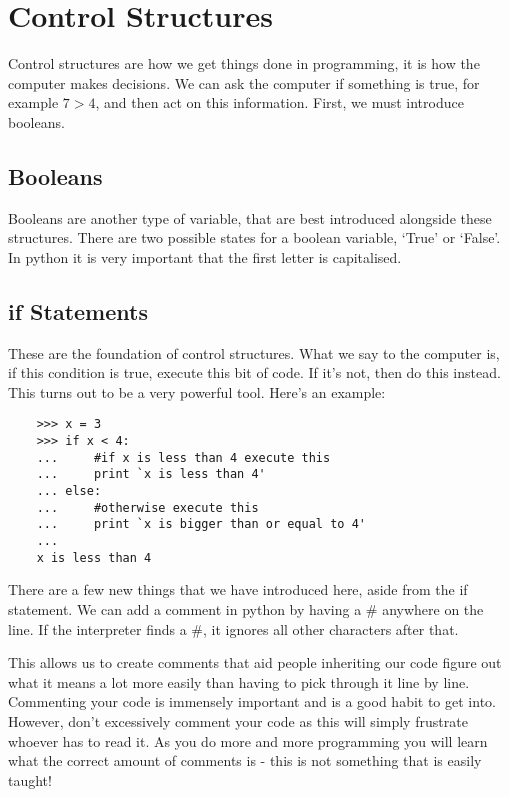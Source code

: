 \section{Control Structures}

Control structures are how we get things done in programming, it is how the
computer makes decisions. We can ask the computer if something is true, for
example $7 > 4$, and then act on this information. First, we must introduce
booleans.

\subsection {Booleans}

Booleans are another type of variable, that are best introduced alongside these
structures. There are two possible states for a boolean variable, `True' or
`False'. In python it is very important that the first letter is capitalised.

\subsection{if Statements}

These are the foundation of control structures. What we say to the computer is,
if this condition is true, execute this bit of code. If it's not, then do this
instead. This turns out to be a very powerful tool. Here's an example:

\begin{lstlisting}
    >>> x = 3
    >>> if x < 4:
    ...     #if x is less than 4 execute this
    ...     print `x is less than 4'
    ... else:
    ...     #otherwise execute this
    ...     print `x is bigger than or equal to 4'
    ...
    x is less than 4
\end{lstlisting}

There are a few new things that we have introduced here, aside from the if
statement. We can add a comment in python by having a \# anywhere on the line.
If the interpreter finds a \#, it ignores all other characters after that.

This allows us to create comments that aid people inheriting our code figure
out what it means a lot more easily than having to pick through it line by line.
Commenting your code is immensely important and is a good habit to get into.
However, don't excessively comment your code as this will simply frustrate
whoever has to read it. As you do more and more programming you will learn what
the correct amount of comments is - this is not something that is easily taught!

